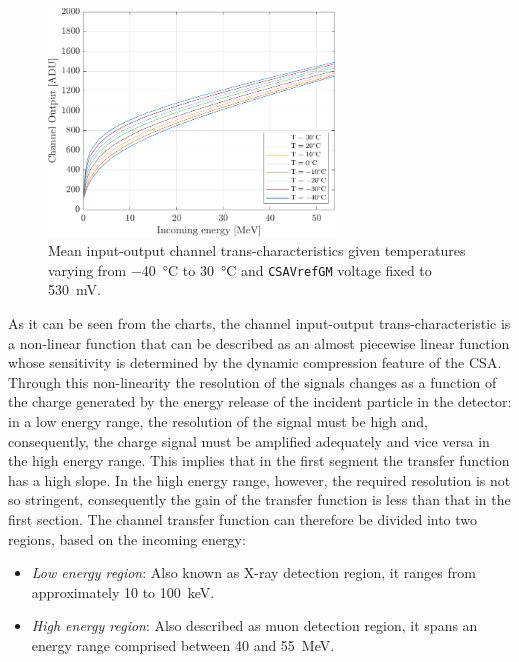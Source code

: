 \begin{figure}[h!]
    \centering
    \includegraphics[width=0.68\textwidth]{Images/chap1/results/FDT/fdt_csavrefgm_530mV_tau6_keV.pdf}
    \caption{Mean input-output channel trans-characteristics given temperatures varying from \SI{-40}{\celsius} to \SI{30}{\celsius} and \texttt{CSAVrefGM} voltage fixed to \SI{530}{\milli\volt}.}
    \label{figFDTplot530mV}
\end{figure}

\par
As it can be seen from the charts, the channel input-output trans-characteristic is a non-linear function that can be described as an almost piecewise linear function whose sensitivity is determined by the dynamic compression feature of the CSA. Through this non-linearity the resolution of the signals changes as a function of the charge generated by the energy release of the incident particle in the detector: in a low energy range, the resolution of the signal must be high and, consequently, the charge signal must be amplified adequately and vice versa in the high energy range. This implies that in the first segment the transfer function has a high slope. In the high energy range, however, the required resolution is not so stringent, consequently the gain of the transfer function is less than that in the first section. The channel transfer function can therefore be divided into two regions, based on the incoming energy:

\begin{itemize}
    \itemsep0em
    \item \textit{Low energy region}: Also known as X-ray detection region, it ranges from approximately 10 to \SI{100}{\kilo\electronvolt}.
    \item \textit{High energy region}: Also described as muon detection region, it spans an energy range comprised between 40 and \SI{55}{\mega\electronvolt}.
\end{itemize}

